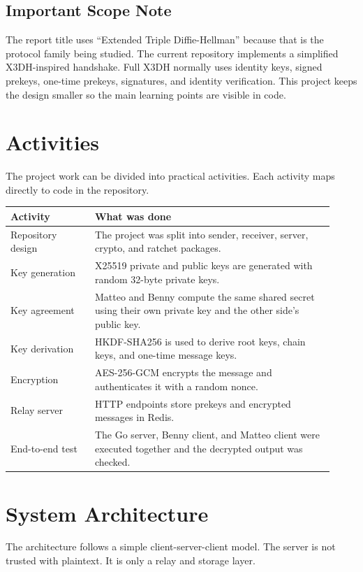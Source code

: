 \documentclass[12pt,a4paper]{article}
\begin{document}
\subsection{Important Scope Note}

The report title uses ``Extended Triple Diffie-Hellman'' because that is the protocol family being studied. The current repository implements a simplified X3DH-inspired handshake. Full X3DH normally uses identity keys, signed prekeys, one-time prekeys, signatures, and identity verification. This project keeps the design smaller so the main learning points are visible in code.

\section{Activities}

The project work can be divided into practical activities. Each activity maps directly to code in the repository.

\begin{longtable}{p{0.24\linewidth} p{0.68\linewidth}}
\toprule
\textbf{Activity} & \textbf{What was done} \\
\midrule
Repository design & The project was split into sender, receiver, server, crypto, and ratchet packages. \\
Key generation & X25519 private and public keys are generated with random 32-byte private keys. \\
Key agreement & Matteo and Benny compute the same shared secret using their own private key and the other side's public key. \\
Key derivation & HKDF-SHA256 is used to derive root keys, chain keys, and one-time message keys. \\
Encryption & AES-256-GCM encrypts the message and authenticates it with a random nonce. \\
Relay server & HTTP endpoints store prekeys and encrypted messages in Redis. \\
End-to-end test & The Go server, Benny client, and Matteo client were executed together and the decrypted output was checked. \\
\bottomrule
\end{longtable}

\section{System Architecture}

The architecture follows a simple client-server-client model. The server is not trusted with plaintext. It is only a relay and storage layer.
\end{document}
